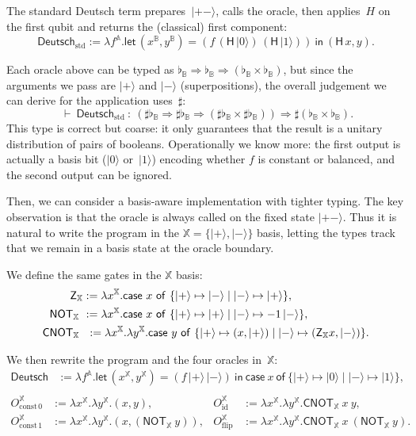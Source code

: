 \documentclass[runningheads,orivec,envcountsame,envcountsect]{llncs}
\newcommand\ket[1]{\ensuremath{|#1\rangle}}
\newcommand\AbsBasis{\ensuremath{\mathbb{A}}}
\def\Pair#1#2{(#1,#2)} %
\def\Lam#1#2#3{\lambda#1^{#2}{.}#3} %
\def\letkeyword{\mathsf{let}}
\def\inkeyword{\mathsf{in}}
\def\LetP#1#2#3#4#5#6{\letkeyword\,\Pair{#1^{#2}}{#3^{#4}}=#5~\inkeyword~#6}
\def\case#1#2#3#4#5{\ensuremath{\mathsf{case}~#1~\mathsf{of}~\{#2\mapsto #4 \mid #3\mapsto #5\}}}
\def\Arr{\Rightarrow}
\def\TYP#1#2#3{#1~{\vdash}~#2~{:}~#3}
\newcommand\B{\mathbb B}
\newcommand\XB{\mathbb X}
\newcommand\Hd{\mathsf{H}}
\newcommand{\pauliZXB}{\mathsf{Z}_{\XB}}
\newcommand{\cnotXB}[2]{\mathsf{CNOT}_{\XB}\ #1\ #2}
\newcommand{\pauliXXB}[1]{\mathsf{NOT}_{\XB}\ #1}
\newcommand\basis[1]{\ensuremath{\flat_{#1}}}
\begin{document}
The standard Deutsch term prepares~$\ket{+-}$, calls the oracle, then
applies~$H$ on the first qubit and returns the (classical) first component:
\[
  \mathsf{Deutsch}_{\mathrm{std}} :=
  \Lam{f}{\AbsBasis}{
    \LetP{x}{\B}{y}{\B}
      {(f\,(\Hd\,\ket{0})\,(\Hd\,\ket{1}))}
      {\Pair{\Hd\,x}{y}}
  }.
\]

Each oracle above can be typed as
\(
  \basis{\B}\Arr\basis{\B}\Arr(\basis{\B}\times\basis{\B})
\),
but since the arguments we pass are $\ket{+}$ and $\ket{-}$ (superpositions),
the overall judgement we can derive for the application uses~$\sharp$:
\[
  \TYP{}{\mathsf{Deutsch}_{\mathrm{std}}}
  {(\sharp\basis{\B}\Arr\sharp\basis{\B}\Arr(\sharp\basis{\B}\times\sharp\basis{\B}))
   \Arr \sharp(\basis{\B}\times\basis{\B})}.
\]
This type is correct but coarse: it only guarantees that the result is a
unitary distribution of pairs of booleans.  Operationally we know more: the
first output is actually a basis bit ($\ket{0}$ or~$\ket{1}$) encoding whether
$f$ is constant or balanced, and the second output can be ignored.

Then, we can consider a basis-aware implementation with tighter typing.
The key observation is that the oracle is always called on the fixed state
$\ket{+-}$.  
Thus it is natural to write the program in the
$\XB=\{\ket{+},\ket{-}\}$ basis, letting the types track that we remain in a
basis state at the oracle boundary.

We define the same gates in the $\XB$ basis:
\begin{align*}
  \pauliZXB &:= \Lam{x}{\XB}{\case{x}{\ket{+}}{\ket{-}}{\ket{-}}{\ket{+}}},\\
  \pauliXXB &:= \Lam{x}{\XB}{\case{x}{\ket{+}}{\ket{-}}{\ket{+}}{-1\,\ket{-}}},\\
  \cnotXB &:= \Lam{x}{\XB}{\Lam{y}{\XB}{
    \case{y}{\ket{+}}{\ket{-}}
      {\Pair{x}{\ket{+}}}
      {\Pair{\pauliZXB{x}}{\ket{-}}}
  }}.
\end{align*}

We then rewrite the program and the four oracles in~$\XB$:
\begin{align*}
  \mathsf{Deutsch} &:= \Lam{f}{\AbsBasis}{ \LetP{x}{\XB}{y}{\XB}{(f\,\ket{+}\,\ket{-})} {\case{x}{\ket{+}}{\ket{-}}{\ket{0}}{\ket{1}}}},\\
\end{align*}
\vspace{-2\baselineskip}
\begin{align*}
  O_{\mathrm{const}\,0}^{\XB} &:= \Lam{x}{\XB}{\Lam{y}{\XB}{\Pair{x}{y}}},
  &O_{\mathrm{id}}^{\XB}\ \ &:= \Lam{x}{\XB}{\Lam{y}{\XB}{\cnotXB{x}{y}}},\\
  O_{\mathrm{const}\,1}^{\XB} &:= \Lam{x}{\XB}{\Lam{y}{\XB}{\Pair{x}{(\pauliXXB{y})}}},
  &O_{\mathrm{flip}}^{\XB} &:= \Lam{x}{\XB}{\Lam{y}{\XB}{\cnotXB{x}{(\pauliXXB{y})}}}.
\end{align*}
\end{document}
